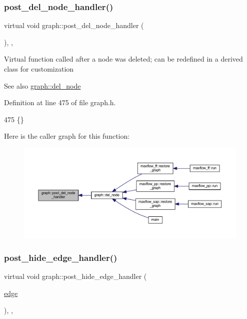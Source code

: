 \subsubsection{\texorpdfstring{post\+\_\+del\+\_\+node\+\_\+handler()}{post\_del\_node\_handler()}}
{\footnotesize\ttfamily virtual void graph\+::post\+\_\+del\+\_\+node\+\_\+handler (\begin{DoxyParamCaption}{ }\end{DoxyParamCaption})\hspace{0.3cm}{\ttfamily [inline]}, {\ttfamily [virtual]}, {\ttfamily [inherited]}}

Virtual function called after a node was deleted; can be redefined in a derived class for customization

\begin{DoxySeeAlso}{See also}
\mbox{\hyperlink{classgraph_a8bdc09d5b9ac4bd26586b054d8fcbe91}{graph\+::del\+\_\+node}} 
\end{DoxySeeAlso}


Definition at line 475 of file graph.\+h.


\begin{DoxyCode}
475 \{\}          
\end{DoxyCode}
Here is the caller graph for this function\+:
\nopagebreak
\begin{figure}[H]
\begin{center}
\leavevmode
\includegraphics[width=350pt]{classgraph_a4e08a559e3f1007a1a16a53c9a15cb0f_icgraph}
\end{center}
\end{figure}
\mbox{\label{classgraph_ad4614e74a125054eb3e180f6f32ab7bb}} 
\subsubsection{\texorpdfstring{post\+\_\+hide\+\_\+edge\+\_\+handler()}{post\_hide\_edge\_handler()}}
{\footnotesize\ttfamily virtual void graph\+::post\+\_\+hide\+\_\+edge\+\_\+handler (\begin{DoxyParamCaption}\item[{\mbox{\hyperlink{classedge}{edge}}}]{ }\end{DoxyParamCaption})\hspace{0.3cm}{\ttfamily [inline]}, {\ttfamily [virtual]}, {\ttfamily [inherited]}}

